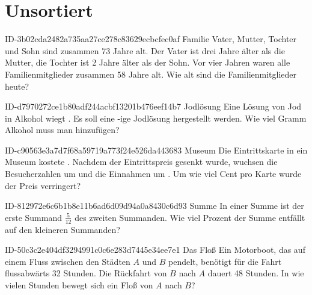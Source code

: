 \setcounter{chapter}{-1}
\chapter{Unsortiert}

\begin{exercise}
      {ID-3b02cda2482a735aa27ce278c83629ecbcfec0af}
      {Familie}
  \ifproblem\problem
    Vater, Mutter, Tochter und Sohn sind zusammen 73 Jahre alt.
    Der Vater ist drei Jahre älter als die Mutter, die Tochter
    ist 2 Jahre älter als der Sohn. Vor vier Jahren waren
    alle Familienmitglieder zusammen 58 Jahre alt.
    Wie alt sind die Familienmitglieder heute?
  \fi
\end{exercise}

\begin{exercise}
      {ID-d7970272ce1b80adf244acbf13201b476eef14b7}
      {Jodlösung}
  \ifproblem\problem
    Eine Lösung von  Jod in Alkohol wiegt .
    Es soll eine -ige Jodlösung hergestellt werden.
    Wie viel Gramm Alkohol muss man hinzufügen?
  \fi
\end{exercise}

\begin{exercise}
      {ID-c90563e3a7d7f68a59719a773f24e526da443683}
      {Museum}
  \ifproblem\problem
    Die Eintrittskarte in ein Museum kostete . Nachdem der Eintrittspreis
    gesenkt wurde, wuchsen die Besucherzahlen um  und die Einnahmen um .
    Um wie viel Cent pro Karte wurde der Preis verringert?
  \fi
\end{exercise}

\begin{exercise}
      {ID-812972e6c6b1b8e11b6ad6d09d94a0a8430c6d93}
      {Summe}
  \ifproblem\problem
    In einer Summe ist der erste Summand $\frac{5}{12}$ des zweiten Summanden.
    Wie viel Prozent der Summe entfällt auf den kleineren Summanden?
  \fi
\end{exercise}

\begin{exercise}
      {ID-50c3c2e404df3294991c0c6e283d7445e34ee7e1}
      {Das Floß}
  \ifproblem\problem
    Ein Motorboot, das auf einem Fluss zwischen den Städten $A$ und $B$ pendelt,
    benötigt für die Fahrt flussabwärts 32 Stunden. Die Rückfahrt von $B$ nach
    $A$ dauert 48 Stunden. In wie vielen Stunden bewegt sich ein Floß von $A$
    nach $B$?
  \fi
\end{exercise}

